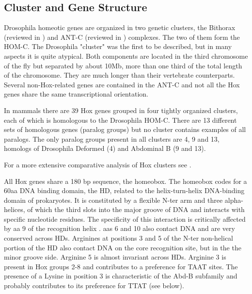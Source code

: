 



\subsection{Cluster and Gene Structure}


Drosophila homeotic genes are organized in two genetic clusters, the  Bithorax (reviewed in \cite{Lewis1978}) and \ac{ANT-C} (reviewed in \cite{Kaufman1990}) complexes. The two of them form the \ac{HOM-C}. The Drosophila "cluster" was the first to be described, but in many aspects it is quite atypical. Both components are located in the third chromosome of the fly but separated by about 10Mb, more than one third of the total length of the chromosome. They are much longer than their vertebrate counterparts. Several non-Hox-related genes are contained in the \ac{ANT-C} and not all the Hox genes share the same transcriptional orientation. 

In mammals there are 39 Hox genes grouped in four tightly organized clusters, each of which is homologous to the Drosophila \ac{HOM-C}. There are 13 different sets of homologous genes (paralog groups) but no cluster contains examples of all paralogs. The only paralog groups present in all clusters are 4, 9 and 13, homologs of Drosophila Deformed (4) and Abdominal B (9 and 13). 


For a more extensive comparative analysis of Hox clusters see \textcite{Duboule2007}.

All Hox genes share a 180 bp sequence, the homeobox. The homeobox codes for a 60aa DNA binding domain, the \ac{HD}, related to the helix-turn-helix DNA-binding domain of prokaryotes. It is constituted by a flexible \ac{N-ter} arm and three alpha-helices, of which the third slots into the major groove of DNA and interacts with specific nucleotide residues. The specificity of this interaction is critically affected by \ac{aa} 9 of the recognition helix \parencite{Treisman1992}. \acp{aa} 6 and 10 also contact DNA and are very conserved across \acp{HD}. Arginines at positions 3 and 5 of the \ac{N-ter} non-helical portion of the \ac{HD} also contact DNA on the core recognition site, but in the the minor groove side. Arginine 5 is almost invariant across \acp{HD}. Arginine 3 is present in Hox groups 2-8 and contributes to a preference for TAAT sites. The presence of a Lysine in position 3 is characteristic of the \ac{Abd-B} subfamily and probably contributes to its preference for TTAT (see below).


